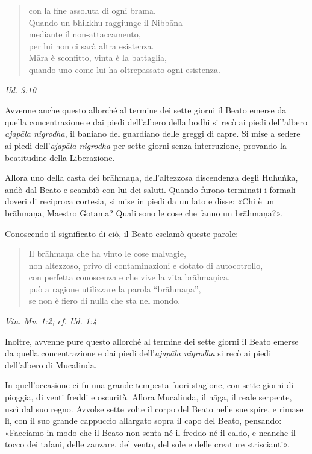 \begin{quote}
con la fine assoluta di ogni brama. \\
Quando un bhikkhu raggiunge il Nibbāna \\
mediante il non-attaccamento, \\
per lui non ci sarà altra esistenza. \\
Māra è sconfitto, vinta è la battaglia, \\
quando uno come lui ha oltrepassato ogni esistenza.
\end{quote}

\emph{Ud. 3:10}


 Avvenne anche questo allorché al termine dei sette giorni
il Beato emerse da quella concentrazione e dai piedi dell’albero della
bodhi si recò ai piedi dell’albero \emph{ajapāla nigrodha}, il baniano del
guardiano delle greggi di capre. Si mise a sedere ai piedi dell’\emph{ajapāla
nigrodha} per sette giorni senza interruzione, provando la beatitudine
della Liberazione.


Allora uno della casta dei brāhmaṇa, dell’altezzosa discendenza degli
Huhuṅka, andò dal Beato e scambiò con lui dei saluti. Quando furono
terminati i formali doveri di reciproca cortesia, si mise in piedi da un
lato e disse: «Chi è un brāhmaṇa, Maestro Gotama? Quali sono le cose che
fanno un brāhmaṇa?».


Conoscendo il significato di ciò, il Beato esclamò queste parole:


\begin{quote}
Il brāhmaṇa che ha vinto le cose malvagie, \\
non altezzoso, privo di contaminazioni e dotato di autocotrollo, \\
con perfetta conoscenza e che vive la vita brāhmaṇica, \\
può a ragione utilizzare la parola “brāhmaṇa”, \\
se non è fiero di nulla che sta nel mondo.
\end{quote}

\emph{Vin. Mv. 1:2; cf. Ud. 1:4}


Inoltre, avvenne pure questo allorché al termine dei sette giorni il
Beato emerse da quella concentrazione e dai piedi dell’\emph{ajapāla
nigrodha} si recò ai piedi dell’albero di Mucalinda.


In quell’occasione ci fu una grande tempesta fuori stagione, con sette
giorni di pioggia, di venti freddi e oscurità. Allora Mucalinda, il
nāga, il reale serpente, uscì dal suo regno. Avvolse sette volte il
corpo del Beato nelle sue spire, e rimase lì, con il suo grande
cappuccio allargato sopra il capo del Beato, pensando: «Facciamo in modo
che il Beato non senta né il freddo né il caldo, e neanche il tocco dei
tafani, delle zanzare, del vento, del sole e delle creature
striscianti».


